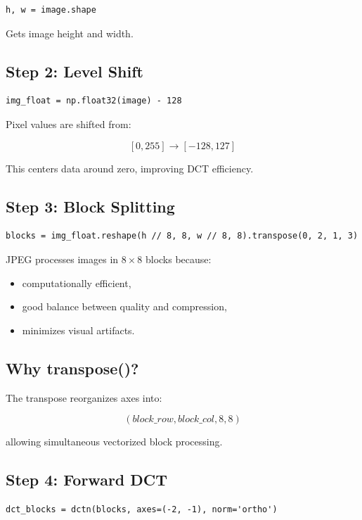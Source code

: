 \documentclass[12pt,a4paper]{article}
\begin{document}
\begin{lstlisting}
h, w = image.shape
\end{lstlisting}

Gets image height and width.

\subsection{Step 2: Level Shift}

\begin{lstlisting}
img_float = np.float32(image) - 128
\end{lstlisting}

Pixel values are shifted from:

\[
[0,255] \rightarrow [-128,127]
\]

This centers data around zero, improving DCT efficiency.

\subsection{Step 3: Block Splitting}

\begin{lstlisting}
blocks = img_float.reshape(h // 8, 8, w // 8, 8).transpose(0, 2, 1, 3)
\end{lstlisting}

JPEG processes images in \(8 \times 8\) blocks because:
\begin{itemize}
    \item computationally efficient,
    \item good balance between quality and compression,
    \item minimizes visual artifacts.
\end{itemize}

\subsection{Why transpose()?}

The transpose reorganizes axes into:

\[
(block\_row, block\_col, 8, 8)
\]

allowing simultaneous vectorized block processing.

\subsection{Step 4: Forward DCT}

\begin{lstlisting}
dct_blocks = dctn(blocks, axes=(-2, -1), norm='ortho')
\end{lstlisting}
\end{document}
